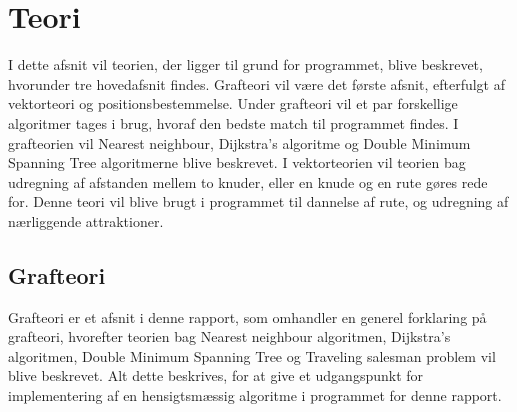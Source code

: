 \chapter{Teori}
I dette afsnit vil teorien, der ligger til grund for programmet, blive beskrevet, hvorunder tre hovedafsnit findes. Grafteori vil være det første afsnit, efterfulgt af vektorteori og  positionsbestemmelse. Under grafteori vil et par forskellige algoritmer tages i brug, hvoraf den bedste match til programmet findes. I grafteorien vil Nearest neighbour, Dijkstra’s algoritme og Double Minimum Spanning Tree algoritmerne blive beskrevet. I vektorteorien vil teorien bag udregning af afstanden mellem to knuder, eller en knude og en rute gøres rede for. Denne teori vil blive brugt i programmet til dannelse af rute, og udregning af nærliggende attraktioner.

\section{Grafteori}
Grafteori er et afsnit i denne rapport, som omhandler en generel forklaring på grafteori, hvorefter teorien bag Nearest neighbour algoritmen, Dijkstra’s algoritmen, Double Minimum Spanning Tree og Traveling salesman problem vil blive beskrevet. Alt dette beskrives, for at give et udgangspunkt for implementering af en hensigtsmæssig algoritme i programmet for denne rapport.

